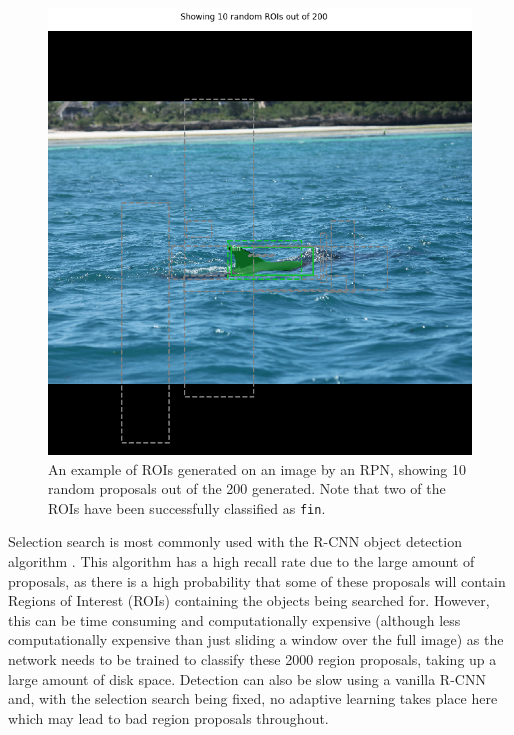 \begin{figure}
	\begin{center}
		\includegraphics[scale=0.45]{Chapter2/figs/rpn-ten-random.png}
	\end{center}
	\caption{An example of ROIs generated on an image by an RPN, showing 10 random proposals out of the 200 generated. Note that two of the ROIs have been successfully classified as \texttt{fin}.}
	\label{fig:rpn-randoms}
\end{figure}

Selection search is most commonly used with the R-CNN object detection algorithm \cite{girshick_rich_2014}. This algorithm has a high recall rate due to the large amount of proposals, as there is a high probability that some of these proposals will contain Regions of Interest (ROIs) containing the objects being searched for. However, this can be time consuming and computationally expensive (although less computationally expensive than just sliding a window over the full image) as the network needs to be trained to classify these 2000 region proposals, taking up a large amount of disk space. Detection can also be slow using a vanilla R-CNN and, with the selection search being fixed, no adaptive learning takes place here which may lead to bad region proposals throughout. 

